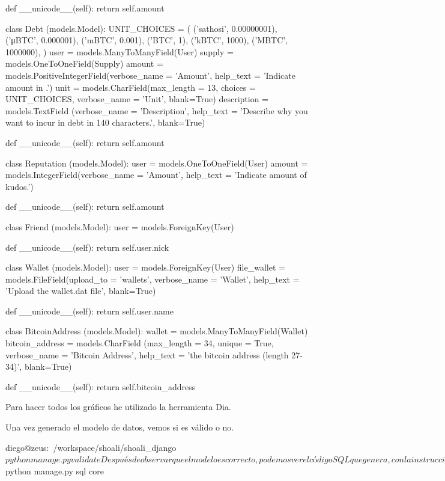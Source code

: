 \documentclass[a4paper, 12pt]{book}
\begin{document}
  def __unicode__(self):
    return self.amount
 
class Debt (models.Model):
  UNIT_CHOICES = (
          ('sathosi', 0.00000001),
          ('μBTC', 0.000001),
          ('mBTC', 0.001),
          ('BTC', 1),
          ('kBTC', 1000),
          ('MBTC', 1000000),
          )
  user = models.ManyToManyField(User)
  supply = models.OneToOneField(Supply)
  amount = models.PositiveIntegerField(verbose_name = 'Amount',
     help_text = 'Indicate amount in .')
  unit = models.CharField(max_length = 13, choices = UNIT_CHOICES,
     verbose_name = 'Unit', blank=True)
  description = models.TextField (verbose_name = 'Description',
     help_text = 'Describe why you want to incur in debt in 140 characters.',
     blank=True)
 
  def __unicode__(self):
    return self.amount
 
class Reputation (models.Model):
  user = models.OneToOneField(User)
  amount = models.IntegerField(verbose_name = 'Amount',
     help_text = 'Indicate amount of kudos.')
 
  def __unicode__(self):
    return self.amount
 
class Friend (models.Model):
  user = models.ForeignKey(User)
 
  def __unicode__(self):
    return self.user.nick
 
class Wallet (models.Model):
  user = models.ForeignKey(User)
  file_wallet = models.FileField(upload_to = 'wallets', verbose_name = 'Wallet',
     help_text = 'Upload the wallet.dat file', blank=True)
 
  def __unicode__(self):
    return self.user.name
 
class BitcoinAddress (models.Model):
  wallet = models.ManyToManyField(Wallet)
  bitcoin_address = models.CharField (max_length = 34, unique = True,
     verbose_name = 'Bitcoin Address',
     help_text = 'the bitcoin address (length 27-34)', blank=True)
 
  def __unicode__(self):
    return self.bitcoin_address

Para hacer todos los gráficos he utilizado la herramienta Dia.

Una vez generado el modelo de datos, vemos si es válido o no.

diego@zeus:~/workspace/shoali/shoali_django$ python manage.py validate

Después de observar que el modelo es correcto, podemos ver el código SQL que genera, con la instrucción:

diego@zeus:~/workspace/shoali/shoali_django$ python manage.py sql core
\end{document}
